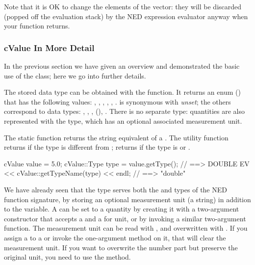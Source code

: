 \begin{note}
Note that it is OK to change the elements of the  vector: they
will be discarded (popped off the evaluation stack) by the NED expression
evaluator anyway when your function returns.
\end{note}


\subsubsection{cValue In More Detail}
\label{sec:sim-lib:cvalue-in-more-detail}

In the previous section we have given an overview and demonstrated the basic
use of the  class; here we go into further details.

The stored data type can be obtained with the  function.
It returns an enum () that has the following values:
, , , , , .
 is synonymous with \textit{unset}; the others correspond to data
types: , , , 
(), .
There is no separate  type: quantities are also represented with
the  type, which has an optional associated measurement unit.

The  static function returns the string equivalent of
a . The utility function  returns 
if the type is different from ;  returns 
if the type is  or .

\begin{cpp}
cValue value = 5.0;
cValue::Type type = value.getType(); // ==> DOUBLE
EV << cValue::getTypeName(type) << endl; // ==> "double"
\end{cpp}

We have already seen that the  type serves both the
 and  types of the NED function
signature, by storing an optional measurement unit (a string)
in addition to the  variable. A  can be set
to a quantity by creating it with a two-argument constructor that accepts
a  and a  for unit, or by invoking a similar
two-argument  function. The measurement unit can be read with
, and overwritten with . If you assign a
 to a  or invoke the one-argument
 method on it, that will clear the measurement unit. If you
want to overwrite the number part but preserve the original unit, you need
to use the  method.

